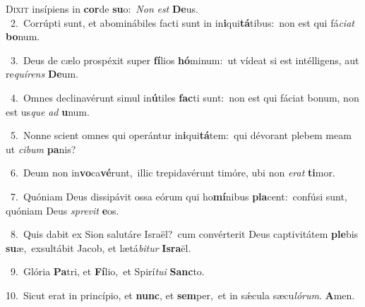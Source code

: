 \lettrine{\initial\textcolor{\initialcolor}{D}}{ixit} insípiens in \textbf{cor}\-de \textbf{su}\-o:~\star \textit{Non} \textit{est} \textbf{De}\-us.\\
{\numbfont\textcolor{\numbcolor}{~2.}}~Corrúpti sunt, et abominábiles facti sunt in in\-\textbf{i}\-qui\-\textbf{tá}\-tibus:~\star non est qui fá\-\textit{ci}\-\textit{at} \textbf{bo}\-num.\par
{\numbfont\textcolor{\numbcolor}{~3.}}~Deus de cælo prospéxit super \textbf{fí}\-lios \textbf{hó}\-minum:~\star ut vídeat si est intélligens, aut re\-\textit{quí}\-\textit{rens} \textbf{De}\-um.\par
{\numbfont\textcolor{\numbcolor}{~4.}}~Omnes declinavérunt simul in\-\textbf{ú}\-tiles \textbf{fac}\-ti sunt:~\star non est qui fáciat bonum, non est us\textit{que} \textit{ad} \textbf{u}\-num.\par
{\numbfont\textcolor{\numbcolor}{~5.}}~Nonne scient omnes qui operántur in\-\textbf{i}\-qui\-\textbf{tá}\-tem:~\star qui dévorant plebem meam ut \textit{ci}\-\textit{bum} \textbf{pa}\-nis?\par
{\numbfont\textcolor{\numbcolor}{~6.}}~Deum non in\-\textbf{vo}\-ca\-\textbf{vé}\-runt,~\star illic trepidavérunt timóre, ubi non \textit{e}\-\textit{rat} \textbf{ti}\-mor.\par
{\numbfont\textcolor{\numbcolor}{~7.}}~Quóniam Deus dissipávit ossa eórum qui ho\-\textbf{mí}\-nibus \textbf{pla}\-cent:~\star confúsi sunt, quóniam Deus \textit{spre}\-\textit{vit} \textbf{e}\-os.\par
{\numbfont\textcolor{\numbcolor}{~8.}}~Quis dabit ex Sion salutáre Israël?~\dagger cum convérterit Deus captivitátem \textbf{ple}\-bis \textbf{su}\-æ,~\star exsultábit Jacob, et lætá\-\textit{bi}\-\textit{tur} \textbf{Is}\-\textbf{ra}ël.\par
{\numbfont\textcolor{\numbcolor}{~9.}}~Glória \textbf{Pa}\-tri, et \textbf{Fí}\-lio,~\star et Spirí\-\textit{tu}\-\textit{i} \textbf{Sanc}\-to.\par
{\numbfont\textcolor{\numbcolor}{10.}}~Sicut erat in princípio, et \textbf{nunc}\-, et \textbf{sem}\-per,~\star et in sǽcula sæcu\-\textit{ló}\-\textit{rum}. \textbf{A}\-men.\par

